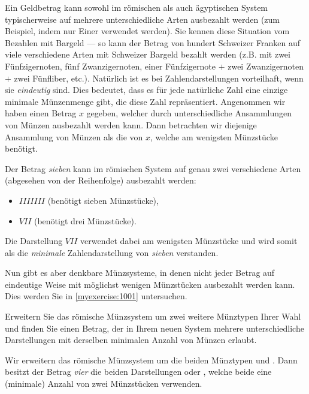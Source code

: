 Ein Geldbetrag kann sowohl im römischen als auch ägyptischen System typischerweise auf mehrere unterschiedliche Arten
ausbezahlt werden (zum Beispiel, indem nur Einer verwendet werden). Sie kennen diese Situation vom Bezahlen mit
Bargeld --- so kann der Betrag von hundert Schweizer Franken auf viele verschiedene Arten mit Schweizer Bargeld bezahlt werden
(z.B. mit zwei Fünfzigernoten, fünf Zwanzigernoten, einer Fünfzigernote $+$ zwei Zwanzigernoten $+$ zwei Fünfliber, etc.). Natürlich ist
es bei Zahlendarstellungen vorteilhaft, wenn sie \textit{eindeutig} sind. Dies bedeutet, dass es für jede natürliche Zahl eine einzige minimale Münzenmenge gibt, die diese Zahl repräsentiert. Angenommen wir haben einen Betrag $x$ gegeben, welcher durch
unterschiedliche Ansammlungen von Münzen ausbezahlt werden kann. Dann betrachten wir diejenige Ansammlung von Münzen als
die  von $x$, welche am wenigsten Münzstücke benötigt.

\begin{myexample}\label{myexample:not_unique}
Der Betrag \textit{sieben} kann im römischen System auf genau zwei verschiedene Arten (abgesehen von der Reihenfolge) ausbezahlt werden:
\begin{itemize}
	\item $IIIIIII$ (benötigt sieben Münzstücke),
	\item $VII$ (benötigt drei Münzstücke).
\end{itemize}
Die Darstellung $VII$ verwendet dabei am wenigsten Münzstücke und wird somit als die \textit{minimale} Zahlendarstellung von
\textit{sieben} verstanden.
\end{myexample}
Nun gibt es aber denkbare Münzsysteme, in denen nicht jeder Betrag auf eindeutige Weise mit möglichst wenigen
Münzstücken ausbezahlt werden kann. Dies werden Sie in \cref{myexercise:1001} untersuchen.

\begin{myexercise}\label{myexercise:1001}
	Erweitern Sie das römische Münzsystem um zwei weitere Münztypen Ihrer Wahl und finden Sie einen Betrag, der in Ihrem
	neuen System mehrere unterschiedliche Darstellungen mit derselben minimalen Anzahl von Münzen erlaubt.
	\begin{myanswer}
		Wir erweitern das römische Münzsystem um die beiden Münztypen  und . Dann besitzt der Betrag
		\textit{vier} die beiden Darstellungen  oder \coin{II}, welche beide eine (minimale) Anzahl von zwei Münzstücken verwenden.
	\end{myanswer}
\end{myexercise}


